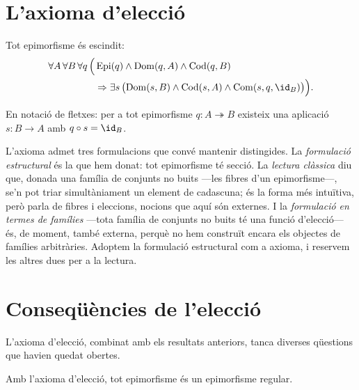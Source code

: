 \section{L'axioma d'elecció}\label{sec:eleccio}

\begin{axioma}[Elecció]\label{ax:eleccio}
Tot epimorfisme és escindit:
\[
\begin{aligned}
\forall A\,\forall B\,\forall q\,\Bigl(
&\operatorname{Epi}(q)\land\Dom(q,A)\land\Cod(q,B)
\\
&{}\Rightarrow
\exists s\,\bigl(\Dom(s,B)\land\Cod(s,A)\land\Com(s,q,\id_B)\bigr)
\Bigr).
\end{aligned}
\]
\end{axioma}

\begin{notacio}[Elecció]\label{not:eleccio}
En notació de fletxes: per a tot epimorfisme \(q\colon A\twoheadrightarrow B\) existeix una aplicació \(s\colon B\to A\) amb \(q\circ s=\id_B\).
\end{notacio}

\begin{observacio}\label{obs:eleccio-lectures}
L'axioma admet tres formulacions que convé mantenir distingides. La \emph{formulació estructural} és la que hem donat: tot epimorfisme té secció. La \emph{lectura clàssica} diu que, donada una família de conjunts no buits ---les fibres d'un epimorfisme---, se'n pot triar simultàniament un element de cadascuna; és la forma més intuïtiva, però parla de fibres i eleccions, nocions que aquí són externes. I la \emph{formulació en termes de famílies} ---tota família de conjunts no buits té una funció d'elecció--- és, de moment, també externa, perquè no hem construït encara els objectes de famílies arbitràries. Adoptem la formulació estructural com a axioma, i reservem les altres dues per a la lectura.
\end{observacio}

\section{Conseqüències de l'elecció}\label{sec:consequencies-eleccio}

L'axioma d'elecció, combinat amb els resultats anteriors, tanca diverses qüestions que havien quedat obertes.

\begin{proposicio}\label{prop:epi-regular-eleccio}
Amb l'axioma d'elecció, tot epimorfisme és un epimorfisme regular.
\end{proposicio}

